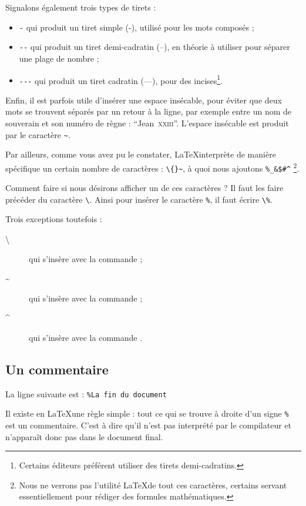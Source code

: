 Signalons également trois types de tirets\label{tirets} :
\begin{itemize}
\item \verb|-| qui produit un tiret simple (-), utilisé pour les mots composés ;
\item \verb|--| qui produit un tiret demi-cadratin (--), en théorie à utiliser pour séparer une plage de nombre ;
\item \verb|---| qui produit un tiret cadratin (---), pour des incises\footnote{Certains éditeurs préférent utiliser des tirets demi-cadratins.}.
\end{itemize}
 
Enfin, il est parfois utile d'insérer une espace insécable, pour éviter que deux mots se trouvent séparés par un retour à la ligne, par exemple entre un nom de souverain et son numéro de règne : \enquote{Jean~\textsc{xxiii}}.  L'espace insécable est produit par le caractère \verb|~|.



Par ailleurs, comme vous avez pu le constater, \LaTeX interprète de manière spécifique un certain nombre de caractères : \verb|\{}~|, à quoi nous ajoutons \verb|%_&$#^| \footnote{Nous ne verrons pas l'utilité \LaTeX  de tout ces caractères, certains servant essentiellement pour rédiger des formules mathématiques.}.

Comment faire si nous désirons afficher un de ces caractères ? Il faut les faire précéder du caractère \verb|\|. Ainsi pour insérer le caractère \verb|%|, il faut écrire \verb|\%|. 

Trois exceptions toutefois :
\begin{description}
\item[\textbackslash] qui s'insère avec la commande  ;
\item[\textasciitilde] qui s'insère avec la commande  ; 
\item[\textasciicircum] qui s'insère avec la commande . 
\end{description} 
\subsection{Un commentaire}

La ligne suivante est : \verb|%La fin du document|

Il existe en \LaTeX une règle simple : tout ce qui se trouve à droite d'un signe \verb|%| est un commentaire.
C'est à dire qu'il n'est pas interprété par le compilateur et n'apparaît donc pas dans le document final. 

